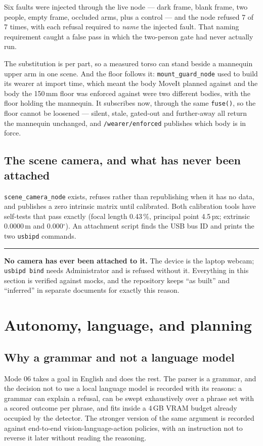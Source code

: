 \documentclass[11pt,a4paper,oneside]{report}
\newcommand{\code}[1]{\texttt{\small #1}}
\newcommand{\dg}{$^{\circ}$}
\newcommand{\keyfact}[1]{%
  \par\vspace{7pt}\noindent
  \hspace*{0pt}\textcolor{srlblue}{\rule{2.5pt}{\dimexpr\baselineskip\relax}}%
  \hspace{9pt}%
  \begin{minipage}[t]{\dimexpr\textwidth-14pt\relax}
  \small #1
  \end{minipage}\par\vspace{7pt}}
\begin{document}
Six faults were injected through the live node --- dark frame, blank frame, two
people, empty frame, occluded arms, plus a control --- and the node refused
7 of 7 times, with each refusal required to \emph{name} the injected fault.
That naming requirement caught a false pass in which the two-person gate had
never actually run.

The substitution is per part, so a measured torso can stand beside a mannequin
upper arm in one scene. And the floor follows it: \code{mount\_guard\_node} used
to build its wearer at import time, which meant the body MoveIt planned against
and the body the 150\,mm floor was enforced against were two different bodies,
with the floor holding the mannequin. It subscribes now, through the same
\code{fuse()}, so the floor cannot be loosened --- silent, stale, gated-out and
further-away all return the mannequin unchanged, and \code{/wearer/enforced}
publishes which body is in force.

\section{The scene camera, and what has never been attached}

\code{scene\_camera\_node} exists, refuses rather than republishing when it has
no data, and publishes a zero intrinsic matrix until calibrated. Both
calibration tools have self-tests that pass exactly (focal length 0.43\,\%,
principal point 4.5\,px; extrinsic 0.0000\,m and 0.000\dg). An attachment
script finds the USB bus ID and prints the two \code{usbipd} commands.

\keyfact{\textbf{No camera has ever been attached to it.} The device is the
laptop webcam; \code{usbipd bind} needs Administrator and is refused without
it. Everything in this section is verified against mocks, and the repository
keeps ``as built'' and ``inferred'' in separate documents for exactly this
reason.}

\chapter{Autonomy, language, and planning}

\section{Why a grammar and not a language model}

Mode 06 takes a goal in English and does the rest. The parser is a grammar, and
the decision not to use a local language model is recorded with its reasons: a
grammar can explain a refusal, can be swept exhaustively over a phrase set with
a scored outcome per phrase, and fits inside a 4\,GB VRAM budget already
occupied by the detector. The stronger version of the same argument is recorded
against end-to-end vision-language-action policies, with an instruction not to
reverse it later without reading the reasoning.
\end{document}
